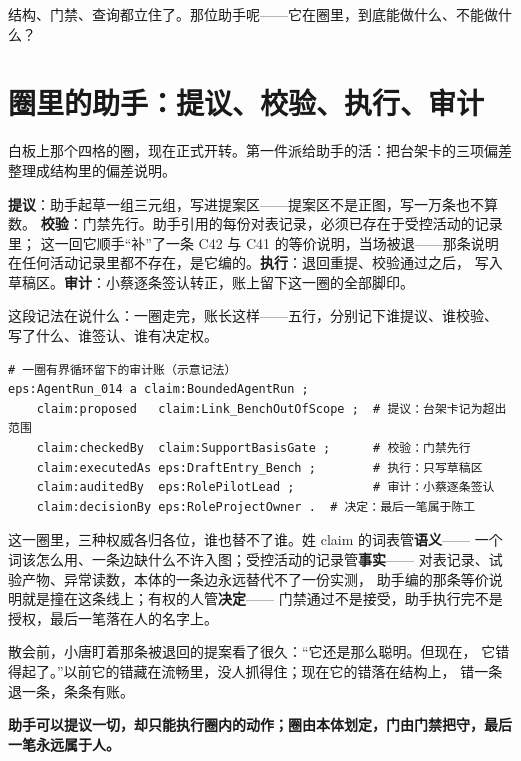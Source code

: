 结构、门禁、查询都立住了。那位助手呢——它在圈里，到底能做什么、不能做什么？

\section{圈里的助手：提议、校验、执行、审计}

白板上那个四格的圈，现在正式开转。第一件派给助手的活：把台架卡的三项偏差
整理成结构里的偏差说明。

\textbf{提议}：助手起草一组三元组，写进提案区——提案区不是正图，写一万条也不算数。
\textbf{校验}：门禁先行。助手引用的每份对表记录，必须已存在于受控活动的记录里；
这一回它顺手“补”了一条 C42 与 C41 的等价说明，当场被退——那条说明
在任何活动记录里都不存在，是它编的。\textbf{执行}：退回重提、校验通过之后，
写入草稿区。\textbf{审计}：小蔡逐条签认转正，账上留下这一圈的全部脚印。

这段记法在说什么：一圈走完，账长这样——五行，分别记下谁提议、谁校验、
写了什么、谁签认、谁有决定权。

\nopagebreak[4]
\begin{codebox}
\begin{Verbatim}[fontsize=\small,breaklines=true,breakanywhere=true,breaksymbolleft={},breaksymbolright={}]
# 一圈有界循环留下的审计账（示意记法）
eps:AgentRun_014 a claim:BoundedAgentRun ;
    claim:proposed   claim:Link_BenchOutOfScope ;  # 提议：台架卡记为超出范围
    claim:checkedBy  claim:SupportBasisGate ;      # 校验：门禁先行
    claim:executedAs eps:DraftEntry_Bench ;        # 执行：只写草稿区
    claim:auditedBy  eps:RolePilotLead ;           # 审计：小蔡逐条签认
    claim:decisionBy eps:RoleProjectOwner .  # 决定：最后一笔属于陈工
\end{Verbatim}
\end{codebox}

这一圈里，三种权威各归各位，谁也替不了谁。姓 claim 的词表管\textbf{语义}——
一个词该怎么用、一条边缺什么不许入图；受控活动的记录管\textbf{事实}——
对表记录、试验产物、异常读数，本体的一条边永远替代不了一份实测，
助手编的那条等价说明就是撞在这条线上；有权的人管\textbf{决定}——
门禁通过不是接受，助手执行完不是授权，最后一笔落在人的名字上。

散会前，小唐盯着那条被退回的提案看了很久：“它还是那么聪明。但现在，
它错得起了。”以前它的错藏在流畅里，没人抓得住；现在它的错落在结构上，
错一条退一条，条条有账。

\textbf{助手可以提议一切，却只能执行圈内的动作；圈由本体划定，门由门禁把守，最后一笔永远属于人。}

